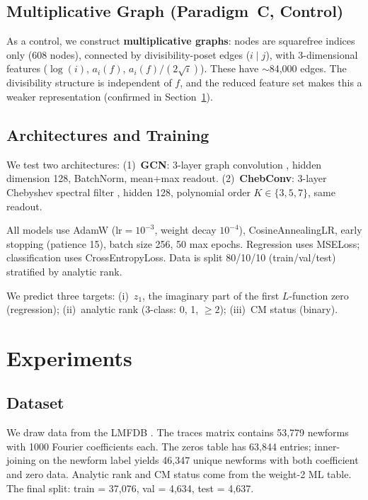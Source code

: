 \documentclass[11pt]{article}
\begin{document}
\subsection{Multiplicative Graph (Paradigm~C, Control)}

As a control, we construct \textbf{multiplicative graphs}: nodes are squarefree indices only (608 nodes), connected by divisibility-poset edges ($i \mid j$), with 3-dimensional features ($\log(i)$, $a_i(f)$, $a_i(f)/(2\sqrt{i})$). These have $\sim$84,000 edges. The divisibility structure is independent of $f$, and the reduced feature set makes this a weaker representation (confirmed in Section~\ref{sec:exp}).

\subsection{Architectures and Training}

We test two architectures: (1)~\textbf{GCN}: 3-layer graph convolution \citep{kipf2017gcn}, hidden dimension 128, BatchNorm, mean+max readout. (2)~\textbf{ChebConv}: 3-layer Chebyshev spectral filter \citep{defferrard2016cheb}, hidden 128, polynomial order $K \in \{3,5,7\}$, same readout.

All models use AdamW ($\mathrm{lr}=10^{-3}$, weight decay $10^{-4}$), CosineAnnealingLR, early stopping (patience 15), batch size 256, 50 max epochs. Regression uses MSELoss; classification uses CrossEntropyLoss. Data is split 80/10/10 (train/val/test) stratified by analytic rank.

We predict three targets: (i)~$z_1$, the imaginary part of the first $L$-function zero (regression); (ii)~analytic rank (3-class: 0, 1, $\geq 2$); (iii)~CM status (binary).

\section{Experiments}
\label{sec:exp}

\subsection{Dataset}

We draw data from the LMFDB \citep{lmfdb2023}. The traces matrix contains 53,779 newforms with 1000 Fourier coefficients each. The zeros table has 63,844 entries; inner-joining on the newform label yields 46,347 unique newforms with both coefficient and zero data. Analytic rank and CM status come from the weight-2 ML table. The final split: train = 37,076, val = 4,634, test = 4,637.
\end{document}
